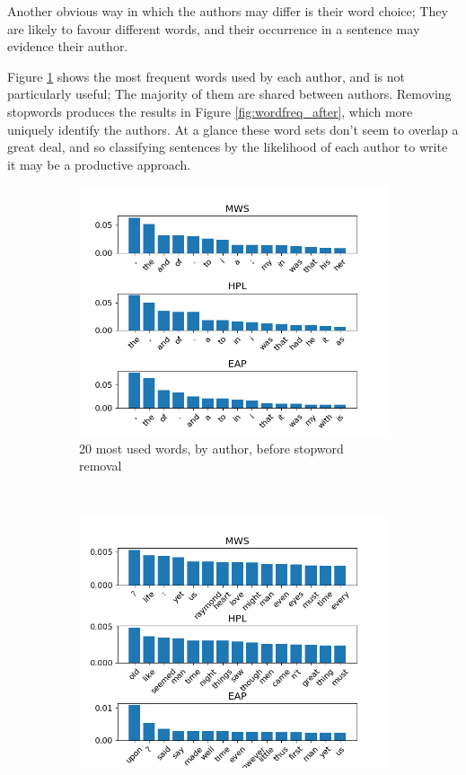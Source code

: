 Another obvious way in which the authors may differ is their word choice; They are likely to favour different words, and their occurrence in a sentence may evidence their author.

Figure \ref{fig:wordfreq_before} shows the most frequent words used by each author, and is not particularly useful; The majority of them are shared between authors. Removing stopwords produces the results in Figure \ref{fig:wordfreq_after}, which more uniquely identify the authors. At a glance these word sets don't seem to overlap a great deal, and so classifying sentences by the likelihood of each author to write it may be a productive approach.

\begin{figure}[h]
\centering
\begin{subfigure}[b]{\columnwidth}
\includegraphics[width=\textwidth]{Figures/Data_Structure/wordfreq_before.png}
\caption{20 most used words, by author, before stopword removal}
\label{fig:wordfreq_before}
\end{subfigure} \\
\begin{subfigure}[b]{\columnwidth}
\includegraphics[width=\textwidth]{Figures/Data_Structure/wordfreq_after.png}

\end{subfigure}
\end{figure}
